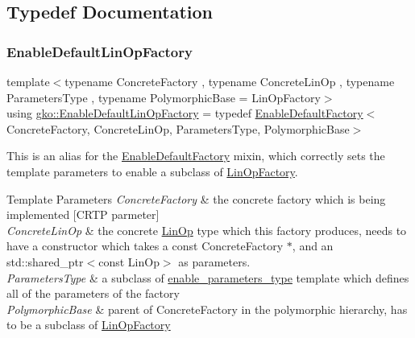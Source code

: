 \subsection{Typedef Documentation}
\mbox{\label{group__LinOp_ga24628d477cba68b31cea690572c51912}} 
\subsubsection{\texorpdfstring{Enable\+Default\+Lin\+Op\+Factory}{EnableDefaultLinOpFactory}}
{\footnotesize\ttfamily template$<$typename Concrete\+Factory , typename Concrete\+Lin\+Op , typename Parameters\+Type , typename Polymorphic\+Base  = Lin\+Op\+Factory$>$ \\
using \hyperlink{group__LinOp_ga24628d477cba68b31cea690572c51912}{gko\+::\+Enable\+Default\+Lin\+Op\+Factory} = typedef \hyperlink{classgko_1_1EnableDefaultFactory}{Enable\+Default\+Factory}$<$Concrete\+Factory, Concrete\+Lin\+Op, Parameters\+Type, Polymorphic\+Base$>$}



This is an alias for the \hyperlink{classgko_1_1EnableDefaultFactory}{Enable\+Default\+Factory} mixin, which correctly sets the template parameters to enable a subclass of \hyperlink{classgko_1_1LinOpFactory}{Lin\+Op\+Factory}. 


\begin{DoxyTemplParams}{Template Parameters}
{\em Concrete\+Factory} & the concrete factory which is being implemented \mbox{[}C\+R\+TP parmeter\mbox{]} \\
\hline
{\em Concrete\+Lin\+Op} & the concrete \hyperlink{classgko_1_1LinOp}{Lin\+Op} type which this factory produces, needs to have a constructor which takes a const Concrete\+Factory $\ast$, and an std\+::shared\+\_\+ptr$<$const Lin\+Op$>$ as parameters. \\
\hline
{\em Parameters\+Type} & a subclass of \hyperlink{structgko_1_1enable__parameters__type}{enable\+\_\+parameters\+\_\+type} template which defines all of the parameters of the factory \\
\hline
{\em Polymorphic\+Base} & parent of Concrete\+Factory in the polymorphic hierarchy, has to be a subclass of \hyperlink{classgko_1_1LinOpFactory}{Lin\+Op\+Factory} \\
\hline
\end{DoxyTemplParams}


